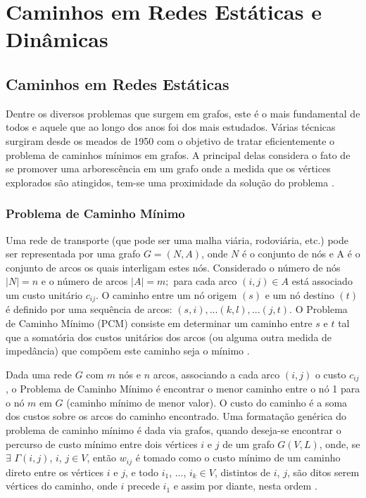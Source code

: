 \chapter{Caminhos em Redes Estáticas e Dinâmicas}

\section{Caminhos em Redes Estáticas}
Dentre os diversos problemas que surgem em grafos, este é o mais fundamental de todos e
aquele que ao longo dos anos foi dos mais estudados. Várias técnicas surgiram desde os meados
de 1950 com o objetivo de tratar eficientemente o problema de caminhos mínimos em grafos. A
principal delas considera o fato de se promover uma arborescência em um grafo onde a medida
que os vértices explorados são atingidos, tem-se uma proximidade da solução do problema \cite{negreirosbook}.

\subsection{Problema de Caminho Mínimo}
Uma rede de transporte (que pode ser uma malha viária, rodoviária, etc.) pode ser
representada por uma grafo $G = (N, A)$, onde $N$ é o conjunto de nós e A é o conjunto de arcos
os quais interligam estes nós. Considerado o número de nós $|N| = n$ e o número de arcos $|A| = m;$ para
cada arco $(i, j) \in A$ está associado um custo unitário $c_{ij}$. O caminho entre um
nó origem $(s)$ e um nó destino $(t)$ é definido por uma sequência de
arcos: $(s,i),...(k,l),...(j,t)$. O Problema de Caminho Mínimo (PCM) consiste em determinar
um caminho entre $s$ e $t$ tal que a somatória dos custos unitários dos arcos (ou alguma
outra medida de impedância) que compõem este caminho seja o mínimo \cite{cunha}.

Dada uma rede $G$ com $m$ nós e $n$ arcos, associando a cada arco $(i,j)$ o custo $c_{ij}$, o Problema
de Caminho Mínimo é encontrar o menor caminho entre o nó 1 para o nó $m$ em $G$ (caminho mínimo de menor valor).
O custo do caminho é a soma dos custos sobre os arcos do caminho encontrado. Uma formatação genérica do problema
de caminho mínimo é dada via grafos, quando deseja-se encontrar o percurso de custo mínimo entre dois vértices $i$ e $j$
de um grafo $G(V,L)$, onde, se $\exists$ $\Gamma (i,j)$, $i$, $j \in V$, então $w_{ij}$ é tomado como o custo mínimo
de um caminho direto entre os vértices $i$ e $j$, e todo $i_1$, ..., $i_k \in V$, distintos de $i$, $j$, são ditos
serem vértices do caminho, onde $i$ precede $i_1$ e assim por diante, nesta ordem \cite{negreirosbook}.

